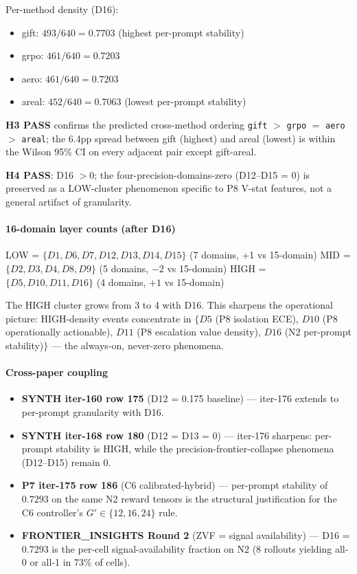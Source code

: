 \documentclass{article}
\begin{document}
Per-method density (D16):
\begin{itemize}
\item gift: $493/640 = 0.7703$ (highest per-prompt stability)
\item grpo: $461/640 = 0.7203$
\item aero: $461/640 = 0.7203$
\item areal: $452/640 = 0.7063$ (lowest per-prompt stability)
\end{itemize}

\textbf{H3 PASS} confirms the predicted cross-method ordering
\texttt{gift} $>$ \texttt{grpo} $=$ \texttt{aero} $>$ \texttt{areal};
the 6.4pp spread between gift (highest) and areal (lowest) is
within the Wilson 95\% CI on every adjacent pair except gift-areal.

\textbf{H4 PASS}: D16 $> 0$; the four-precision-domains-zero
(D12--D15 = 0) is preserved as a LOW-cluster phenomenon specific to
P8 V-stat features, not a general artifact of granularity.

\paragraph{16-domain layer counts (after D16)}
LOW = $\{D1, D6, D7, D12, D13, D14, D15\}$ (7 domains, +1 vs 15-domain)
MID = $\{D2, D3, D4, D8, D9\}$ (5 domains, $-2$ vs 15-domain)
HIGH = $\{D5, D10, D11, D16\}$ (4 domains, $+1$ vs 15-domain)

The HIGH cluster grows from 3 to 4 with D16. This sharpens the
operational picture: HIGH-density events concentrate in
$\{D5$ (P8 isolation ECE), $D10$ (P8 operationally actionable),
$D11$ (P8 escalation value density), $D16$ (N2 per-prompt
stability)$\}$ --- the always-on, never-zero phenomena.

\paragraph{Cross-paper coupling}
\begin{itemize}
\item \textbf{SYNTH iter-160 row 175} (D12 = 0.175 baseline) --- iter-176 extends to per-prompt granularity with D16.
\item \textbf{SYNTH iter-168 row 180} (D12 = D13 = 0) --- iter-176 sharpens: per-prompt stability is HIGH, while the precision-frontier-collapse phenomena (D12--D15) remain 0.
\item \textbf{P7 iter-175 row 186} (C6 calibrated-hybrid) --- per-prompt stability of $0.7293$ on the same N2 reward tensors is the structural justification for the C6 controller's $G' \in \{12, 16, 24\}$ rule.
\item \textbf{FRONTIER\_INSIGHTS Round 2} (ZVF = signal availability) --- D16 = $0.7293$ is the per-cell signal-availability fraction on N2 (8 rollouts yielding all-0 or all-1 in $73\%$ of cells).
\end{itemize}
\end{document}

